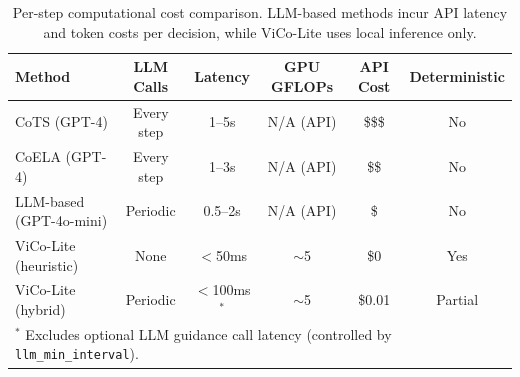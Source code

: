 \begin{table}[t]
\centering
\caption{Per-step computational cost comparison. LLM-based methods incur API latency and token costs per decision, while ViCo-Lite uses local inference only.}
\label{tab:cost_comparison}
\begin{tabular}{lccccc}
\toprule
\textbf{Method} & \textbf{LLM Calls} & \textbf{Latency} & \textbf{GPU GFLOPs} & \textbf{API Cost} & \textbf{Deterministic} \\
\midrule
CoTS (GPT-4) & Every step & 1--5s & N/A (API) & \$\$\$ & No \\
CoELA (GPT-4) & Every step & 1--3s & N/A (API) & \$\$ & No \\
LLM-based (GPT-4o-mini) & Periodic & 0.5--2s & N/A (API) & \$ & No \\
\midrule
ViCo-Lite (heuristic) & None & $<$50ms & $\sim$5 & \$0 & Yes \\
ViCo-Lite (hybrid) & Periodic & $<$100ms$^*$ & $\sim$5 & \$0.01 & Partial \\
\bottomrule
\multicolumn{6}{l}{\footnotesize $^*$ Excludes optional LLM guidance call latency (controlled by \texttt{llm\_min\_interval}).} \\
\end{tabular}
\end{table}

